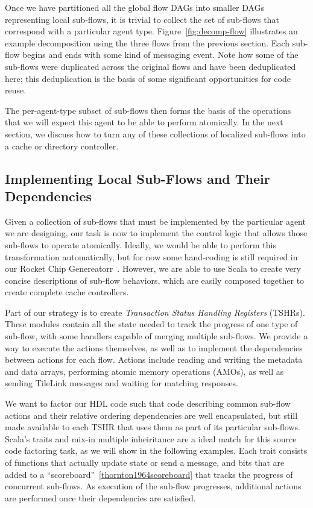 Once we have partitioned all the global flow DAGs into smaller DAGs representing local sub-flows,
it is trivial to collect the set of sub-flows that correspond with a particular agent type.
Figure~\ref{fig:decomp-flow} illustrates an example decomposition using the three flows from the previous section.
Each sub-flow begins and ends with some kind of messaging event.
Note how some of the sub-flows were duplicated across the original flows and have been deduplicated here;
this deduplication is the basis of some significant opportunities for code reuse.

The per-agent-type subset of sub-flows then forms the basis of the operations that we will expect this agent to be able to perform atomically.
In the next section, we discuss how to turn any of these collections of localized sub-flows into a cache or directory controller.

\subsection{Implementing Local Sub-Flows and Their Dependencies}

Given a collection of sub-flows that must be implemented by the particular agent we are designing,
our task is now to implement the control logic that allows those sub-flows to operate atomically.
Ideally, we would be able to perform this transformation automatically, 
but for now some hand-coding is still required in our Rocket Chip Genereatorr~\cite{rocket}.
However, we are able to use Scala to create very concise descriptions of sub-flow behaviors,
which are easily composed together to create complete cache controllers.

Part of our strategy is to create \emph{Transaction Status Handling Registers} (TSHRs).
These modules contain all the state needed to track the progress of 
one type of sub-flow, with some handlers capable of merging multiple sub-flows.
We provide a way to execute the actions themselves, as well as to implement the dependencies between actions for each flow.
Actions include reading and writing the metadata and data arrays,
performing atomic memory operations (AMOs),
as well as sending TileLink messages and waiting for matching responses.

We want to factor our HDL code such that code describing common sub-flow actions and their relative ordering dependencies
are well encapsulated, but still made available to each TSHR that uses them as part of its particular sub-flows.
Scala's traits and mix-in multiple inheiritance are a ideal match for this source code factoring task,
as we will show in the following examples.
Each trait consists of functions that actually update state or send a message,
and bits that are added to a ``scoreboard''~\ref{thornton1964scoreboard} that tracks the progress of concurrent sub-flows.
As execution of the sub-flow progresses, additional actions are performed once their dependencies are satisfied.

